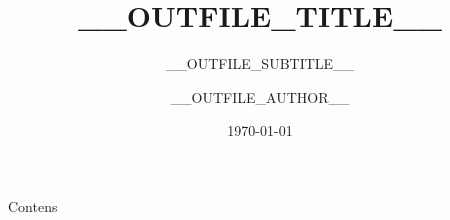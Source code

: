 \documentclass[aspectratio=169]{beamer}
\title{__OUTFILE_TITLE__}
\subtitle{__OUTFILE_SUBTITLE__}
\author{__OUTFILE_AUTHOR__}
\institute{__OUTFILE_INSTITUTE__}
\date{\today}
\begin{document}

\begin{frame}
	\titlepage
\end{frame}

\begin{frame}{Contens}
	\tableofcontents
\end{frame}

\makeatother


\end{document}
